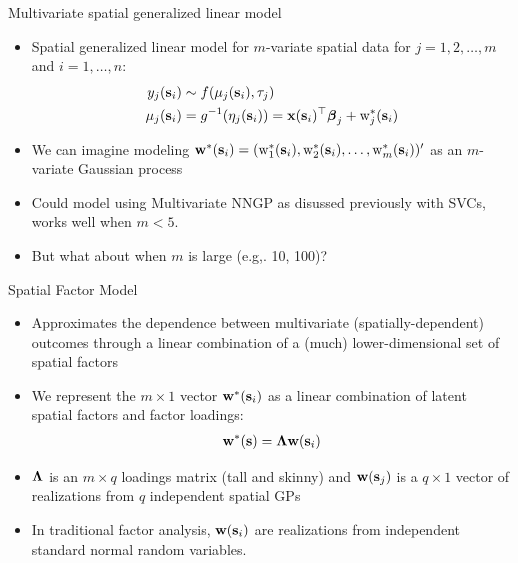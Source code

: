 \begin{frame}{Multivariate spatial generalized linear model}

\begin{itemize}
    \item Spatial generalized linear model for $m$-variate spatial data for $j = 1, 2, \dots, m$ and $i = 1, \dots, n$: 
    \begin{align*}
	    y_j(\textbf{s}_i) &\sim f(\mu_j(\textbf{s}_i), \tau_j) \\
	    \mu_j(\textbf{s}_i) &= g^{-1}(\eta_j(\textbf{s}_i)) = \textbf{x}(\textbf{s}_i)^\top\mbox{\boldmath $ \beta $}_j + \text{w}^\ast_j(\textbf{s}_i)
    \end{align*}
    \item We can imagine modeling $\textbf{w}^\ast(\textbf{s}_i) = (\text{w}^\ast_1(\textbf{s}_i), \text{w}^\ast_2(\textbf{s}_i), \ldots, \text{w}^\ast_m(\textbf{s}_i))'$ as an $m$-variate Gaussian process \pause
    \item Could model using Multivariate NNGP as disussed previously with SVCs, works well when $m < 5$. \pause
    \item But what about when $m$ is large (e.g,. 10, 100)?
\end{itemize}
\end{frame}

\begin{frame}{Spatial Factor Model}
    \begin{itemize}
    \item Approximates the dependence between multivariate (spatially-dependent) outcomes through a linear combination of a (much) lower-dimensional set of spatial factors \pause
    \item We represent the $m \times 1$ vector $\textbf{w}^\ast(\textbf{s}_i)$ as a linear combination of latent spatial factors and factor loadings: 
	    \begin{align*}
                 \textbf{w}^\ast(\textbf{s}) = \mbox{\boldmath $\Lambda$}\textbf{w}(\textbf{s}_i)
	    \end{align*}
    \item $\mbox{\boldmath $\Lambda$}$ is an $m \times q$ loadings matrix (tall and skinny) and $\textbf{w}(\textbf{s}_j)$ is a $q \times 1$ vector of realizations from $q$ independent spatial GPs \pause
    \item In traditional factor analysis, $\textbf{w}(\textbf{s}_i)$ are realizations from independent standard normal random variables.
    \end{itemize}
\end{frame}

